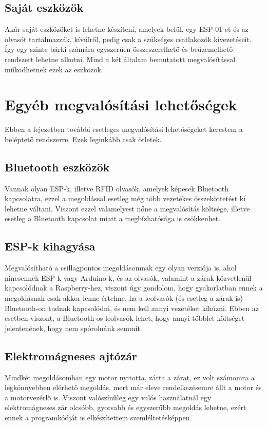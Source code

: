 \documentclass[
]{thesis-ekf}
\theoremstyle{definition}
\theoremstyle{remark}
\begin{document}
\subsection*{Saját eszközök}
Akár saját eszközöket is lehetne készíteni, amelyek belül, egy ESP-01-et és az olvasót tartalmazzák, kívülről, pedig csak a szükséges csatlakozók kivezetéseit. Így egy szinte bárki számára egyszerűen összeszerelhető és beüzemelhető rendszert lehetne alkotni. Mind a két általam bemutatott megvalósítással működhetnek ezek az eszközök.

\section{Egyéb megvalósítási lehetőségek}
Ebben a fejezetben további esetleges megvalósítási lehetőségeket kerestem a beléptető rendszerre. Ezek leginkább csak ötletek.

\subsection*{Bluetooth eszközök}
Vannak olyan ESP-k, illetve RFID olvasók, amelyek képesek Bluetooth kapcsolatra, ezzel a megoldással esetleg még több vezetékes összeköttetést ki lehetne váltani. Viszont ezzel valamelyest nőne a megvalósítás költsége, illetve esetleg a Bluetooth kapcsolat miatt a megbízhatósága is csökkenhet.

\subsection*{ESP-k kihagyása}
Megvalósítható a csillagpontos megoldásomnak egy olyan verziója is, ahol nincsennek ESP-k vagy Arduino-k, és az olvasók, valamint a zárak közvetlenül kapcsolódnak a Raspberry-hez, viszont úgy gondolom, hogy gyakorlatban ennek a megoldásnak csak akkor lenne értelme, ha a leolvasók (és esetleg a zárak is) Bluetooth-on tudnak kapcsolódni, és nem kell annyi vezetéket kihúzni. Ebben az esetben viszont, a Bluetooth-os leolvasók lehet, hogy annyi többlet költséget jelentenének, hogy nem spórolnánk semmit.

\subsection*{Elektromágneses ajtózár}
Mindkét megoldásomban egy motor nyitotta, zárta a zárat, ez volt számomra a legkönnyebben elérhető megoldás, mert már eleve rendelkezésemre állt a motor és a motorvezérlő is. Viszont valószínűleg egy valós használatnál egy elektromágneses zár olcsóbb, gyorsabb és egyszerűbb megoldás lehetne, ezért ennek a programkódját is elkészítettem szemléltetésképpen.
\end{document}
